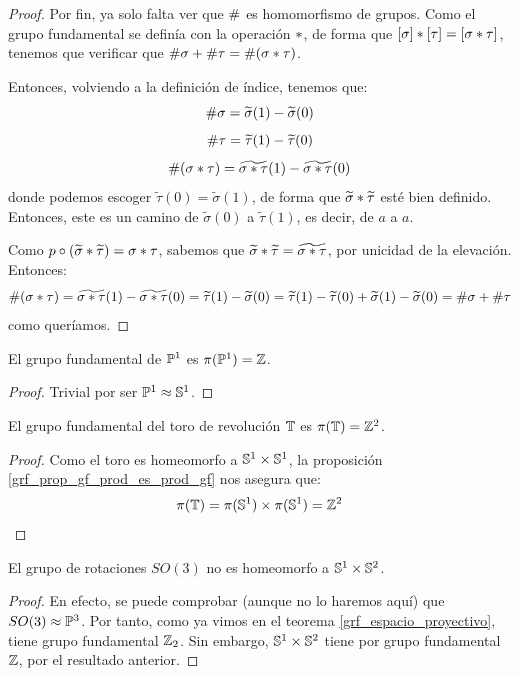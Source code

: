 \begin{theo}
\begin{proof}
Por fin, ya solo falta ver que $\mathrm{\#}$ es homomorfismo de grupos. Como el grupo fundamental se definía con la operación $\mathbin{*}$, de forma que $[\sigma]\mathbin{*}[\tau]=[\sigma\mathbin{*}\tau]$, tenemos que verificar que $\mathrm{\#}\sigma + \mathrm{\#}\tau = \mathrm{\#}(\sigma\mathbin{*}\tau)$.

Entonces, volviendo a la definición de índice, tenemos que:
\[\mathrm{\#}\sigma = \widetilde{\sigma}(1)-\widetilde{\sigma}(0)\]
\[\mathrm{\#}\tau = \widetilde{\tau}(1)-\widetilde{\tau}(0)\]
\[\mathrm{\#}(\sigma\mathbin{*}\tau) = \widetilde{\sigma\mathbin{*}\tau}(1)-\widetilde{\sigma\mathbin{*}\tau}(0)\]
donde podemos escoger $\widetilde{\tau}(0)=\widetilde{\sigma}(1)$, de forma que $\widetilde{\sigma}\mathbin{*}\widetilde{\tau}$ esté bien definido. Entonces, este es un camino de $\widetilde{\sigma}(0)$ a $\widetilde{\tau}(1)$, es decir, de $a$ a $a$.

Como $p\circ(\widetilde{\sigma}\mathbin{*}\widetilde{\tau}) = \sigma\mathbin{*}\tau$, sabemos que $\widetilde{\sigma}\mathbin{*}\widetilde{\tau} = \widetilde{\sigma\mathbin{*}\tau}$, por unicidad de la elevación. Entonces:
\[\mathrm{\#}(\sigma\mathbin{*}\tau)=\widetilde{\sigma\mathbin{*}\tau}(1)-\widetilde{\sigma\mathbin{*}\tau}(0)=\widetilde{\tau}(1)-\widetilde{\sigma}(0)=\widetilde{\tau}(1)-\widetilde{\tau}(0) + \widetilde{\sigma}(1)-\widetilde{\sigma}(0)=\mathrm{\#}\sigma + \mathrm{\#}\tau\]
como queríamos.
\end{proof}
\end{theo}

\begin{cor}
El grupo fundamental de  $\mathbb{P}^1$ es $\pi(\mathbb{P}^1)=\mathbb{Z}$.

\begin{proof}
Trivial por ser $\mathbb{P}^1\approx\mathbb{S}^1$. 
\end{proof}
\end{cor}

\begin{cor}
El grupo fundamental del toro de revolución $\mathbb{T}$ es $\pi(\mathbb{T})=\mathbb{Z}^2$.

\begin{proof}
Como el toro  es homeomorfo a $\mathbb{S}^1\times\mathbb{S}^1$, la proposición \ref{grf_prop_gf_prod_es_prod_gf} nos asegura que:
\[\pi(\mathbb{T})=\pi(\mathbb{S}^1)\times\pi(\mathbb{S}^1)=\mathbb{Z}^2\]
\end{proof}
\end{cor}

\begin{cor}
El grupo de rotaciones  $SO(3)$ no es homeomorfo a $\mathbb{S}^1\times\mathbb{S}^2$.

\begin{proof}
En efecto, se puede comprobar (aunque no lo haremos aquí) que $SO(3)\approx\mathbb{P}^3$. Por tanto, como ya vimos en el teorema \ref{grf_espacio_proyectivo}, tiene grupo fundamental $\mathbb{Z}_2$. Sin embargo, $\mathbb{S}^1\times\mathbb{S}^2$ tiene por grupo fundamental $\mathbb{Z}$, por el resultado anterior.
\end{proof}
\end{cor}

